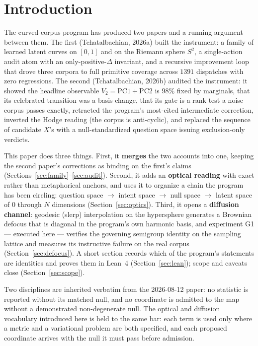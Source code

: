\documentclass[11pt,a4paper]{article}
\theoremstyle{plain}
\theoremstyle{remark}
\begin{document}
\section{Introduction}
\label{sec:intro}

The curved-corpus program has produced two papers and a running argument between them. The first (Tchatalbachian, 2026a) built the instrument: a family of learned latent curves on $[0,1]$ and on the Riemann sphere $S^2$, a single-action audit atom with an only-positive-$\Delta$ invariant, and a recursive improvement loop that drove three corpora to full primitive coverage across $1391$ dispatches with zero regressions. The second (Tchatalbachian, 2026b) audited the instrument: it showed the headline observable $V_2=\mathrm{PC1}+\mathrm{PC2}$ is $98\%$ fixed by marginals, that its celebrated transition was a basis change, that its gate is a rank test a noise corpus passes exactly, retracted the program's most-cited intermediate correction, inverted the Hodge reading (the corpus is anti-cyclic), and replaced the sequence of candidate $X$'s with a null-standardized question space issuing exclusion-only verdicts.

This paper does three things. First, it \textbf{merges} the two accounts into one, keeping the second paper's corrections as binding on the first's claims (Sections~\ref{sec:family}--\ref{sec:audit}). Second, it adds an \textbf{optical reading} with exact rather than metaphorical anchors, and uses it to organize a chain the program has been circling: question space $\to$ intent space $\to$ null space $\to$ latent space of $0$ through $N$ dimensions (Section~\ref{sec:optics}). Third, it opens a \textbf{diffusion channel}: geodesic (slerp) interpolation on the hypersphere generates a Brownian defocus that is diagonal in the program's own harmonic basis, and experiment G1 --- executed here --- verifies the governing semigroup identity on the sampling lattice and measures its instructive failure on the real corpus (Section~\ref{sec:defocus}). A short section records which of the program's statements are identities and proves them in Lean~4 (Section~\ref{sec:lean}); scope and caveats close (Section~\ref{sec:scope}).

Two disciplines are inherited verbatim from the 2026-08-12 paper: no statistic is reported without its matched null, and no coordinate is admitted to the map without a demonstrated non-degenerate null. The optical and diffusion vocabulary introduced here is held to the same bar: each term is used only where a metric and a variational problem are both specified, and each proposed coordinate arrives with the null it must pass before admission.
\end{document}
